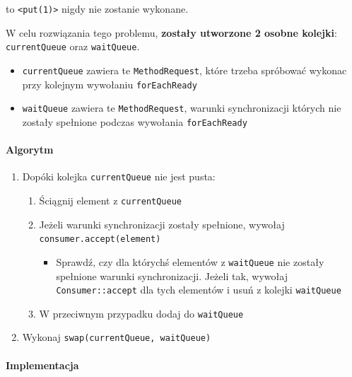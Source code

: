 \documentclass[11pt]{article}
\providecommand{\tightlist}{%
      \setlength{\itemsep}{0pt}\setlength{\parskip}{0pt}}
\begin{document}
to \texttt{\textless{}put(1)\textgreater{}} nigdy nie zostanie wykonane.

W celu rozwiązania tego problemu, \textbf{zostały utworzone 2 osobne
kolejki}: \texttt{currentQueue} oraz \texttt{waitQueue}.

\begin{itemize}
\tightlist
\item
  \texttt{currentQueue} zawiera te \texttt{MethodRequest}, które trzeba
  spróbować wykonac przy kolejnym wywołaniu \texttt{forEachReady}
\item
  \texttt{waitQueue} zawiera te \texttt{MethodRequest}, warunki
  synchronizacji których nie zostały spełnione podczas wywołania
  \texttt{forEachReady}
\end{itemize}

\hypertarget{algorytm}{%
\paragraph{Algorytm}\label{algorytm}}

\begin{enumerate}
\def\labelenumi{\arabic{enumi}.}
\tightlist
\item
  Dopóki kolejka \texttt{currentQueue} nie jest pusta:

  \begin{enumerate}
  \def\labelenumii{\arabic{enumii}.}
  \tightlist
  \item
    Ściągnij element z \texttt{currentQueue}
  \item
    Jeżeli warunki synchronizacji zostały spełnione, wywołaj
    \texttt{consumer.accept(element)}

    \begin{itemize}
    \tightlist
    \item
      Sprawdź, czy dla którychś elementów z \texttt{waitQueue} nie
      zostały spełnione warunki synchronizacji. Jeżeli tak, wywołaj
      \texttt{Consumer::accept} dla tych elementów i usuń z kolejki
      \texttt{waitQueue}
    \end{itemize}
  \item
    W przeciwnym przypadku dodaj do \texttt{waitQueue}
  \end{enumerate}
\item
  Wykonaj \texttt{swap(currentQueue,\ waitQueue)}
\end{enumerate}

    \hypertarget{implementacja}{%
\paragraph{Implementacja}\label{implementacja}}
\end{document}
